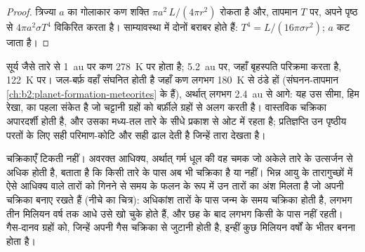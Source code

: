 \begin{proof}
त्रिज्या $a$ का गोलाकार कण शक्ति $\pi a^2\,L/(4\pi r^2)$ रोकता है
और, तापमान $T$ पर, अपने पृष्ठ से $4\pi a^2\sigma T^4$ विकिरित करता है।
साम्यावस्था में दोनों बराबर होते हैं: $T^4 = L/(16\pi\sigma r^2)$; $a$ कट जाता है।
\end{proof}

सूर्य जैसे तारे से \qty{1}{au} पर कण \qty{278}{K} पर होता है;
\qty{5.2}{au} पर, जहाँ बृहस्पति परिक्रमा करता है, \qty{122}{K} पर। जल-बर्फ़ वहाँ संघनित होती है जहाँ
कण लगभग \qty{180}{K} से ठंडे हों (संघनन-तापमान
\cref{ch:b2:planet-formation-meteorites} के हैं), अर्थात् लगभग
\qty{2.4}{au} से आगे: यह उस सीमा, हिम रेखा, का पहला संकेत है जो
चट्टानी ग्रहों को बर्फ़ीले ग्रहों से अलग करती है। वास्तविक चक्रिका अपारदर्शी होती है, और उसका मध्य-तल तारे के सीधे प्रकाश से ओट में रहता है;
प्रतिज्ञप्ति उन पृष्ठीय परतों के लिए सही परिमाण-कोटि और सही ढाल देती है
जिन्हें तारा देखता है।

चक्रिकाएँ टिकती नहीं। अवरक्त आधिक्य, अर्थात् गर्म धूल की वह चमक जो अकेले तारे के उत्सर्जन
से अधिक होती है, बताता है कि किसी तारे के पास अब भी चक्रिका है या नहीं। भिन्न आयु के
तारागुच्छों में ऐसे आधिक्य वाले तारों को गिनने से समय के फलन के रूप में उन तारों का अंश मिलता है
जो अपनी चक्रिका बनाए रखते हैं (नीचे का चित्र): अधिकांश तारों के पास जन्म के समय चक्रिका होती है,
लगभग तीन मिलियन वर्ष तक आधे उसे खो चुके होते हैं, और छह के बाद
लगभग किसी के पास नहीं रहती। गैस-दानव ग्रहों को, जिन्हें अपनी गैस चक्रिका से जुटानी होती है,
इन्हीं कुछ मिलियन वर्षों के भीतर बनना होता है।

